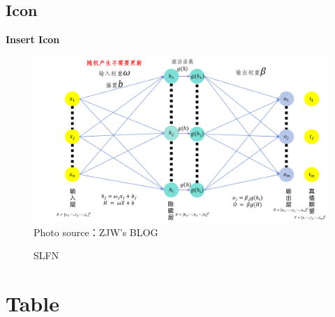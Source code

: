 \documentclass[12pt, aspectratio=169]{beamer}
\begin{document}
\subsection{Icon}
\linespread{1}  
\begin{frame}{\textbf{Insert Icon}}
\linespread{1.5}
	
	\begin{figure}
		\centering 
		\includegraphics[scale=0.3]{Fig/单隐层前馈神经网络(SLFN).pdf}\\ 
		\hspace{-9em}\scriptsize{Photo source：ZJW's BLOG} 
		\vspace{-0.5em} 
		\caption{SLFN} 
		\label{SLFN} 
	\end{figure}
	
\end{frame}

\section{Table}
\end{document}
